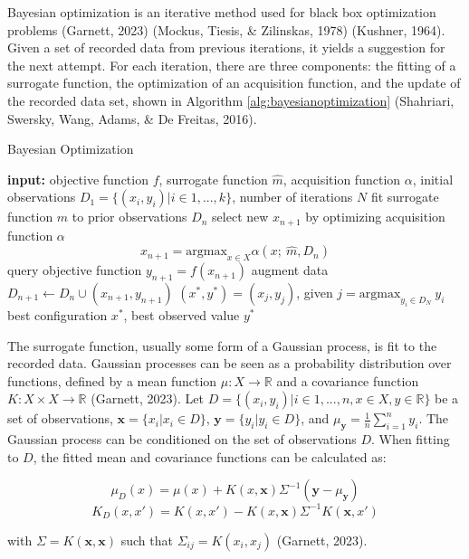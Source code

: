 \documentclass[12pt,twoside]{reedthesis}
\begin{document}
Bayesian optimization is an iterative method used for black box optimization problems (Garnett, 2023) (Mockus, Tiesis, \& Zilinskas, 1978) (Kushner, 1964). Given a set of recorded data from previous iterations, it yields a suggestion for the next attempt. For each iteration, there are three components: the fitting of a surrogate function, the optimization of an acquisition function, and the update of the recorded data set, shown in Algorithm \ref{alg:bayesianoptimization} (Shahriari, Swersky, Wang, Adams, \& De Freitas, 2016).
\begin{algorithm}[H]
    \caption{Bayesian Optimization}
    \label{alg:bayesianoptimization}
    \begin{algorithmic}
    \State \textbf{input:} objective function $f$, surrogate function $\hat{m}$, acquisition function $\alpha$, initial observations $D_1=\{(x_i,y_i)|i\in1,...,k\}$, number of iterations $N$
        \State fit surrogate function $\hat{m}$ to prior observations $D_n$
        \State select new $x_{n+1}$ by optimizing acquisition function $\alpha$\\
            $$x_{n+1}=\text{argmax}_{x\in X} \alpha(x;\ \hat{m}, D_n)$$
        \State query objective function $y_{n+1}=f(x_{n+1})$ 
        \State augment data $D_{n+1}\gets D_n\cup(x_{n+1},y_{n+1})$
    \EndFor
    \State $(x^*,y^*)=(x_j,y_j)$, given $j=\text{argmax}_{y_i\in D_N}\ y_i$
    \State \Return best configuration $x^*$, best observed value $y^*$
    \end{algorithmic}
\end{algorithm}
The surrogate function, usually some form of a Gaussian process, is fit to the recorded data. Gaussian processes can be seen as a probability distribution over functions, defined by a mean function \(\mu:X\to\mathbb{R}\) and a covariance function \(K:X\times X\to\mathbb{R}\) (Garnett, 2023). Let \(D=\{(x_i,y_i)|i\in1,...,n, x\in X,y\in\mathbb{R}\}\) be a set of observations, \(\textbf{x}=\{x_i|x_i\in D\}\), \(\textbf{y}=\{y_i|y_i\in D\}\), and \(\mu_{\textbf{y}}=\frac{1}{n}\sum_{i=1}^ny_i\). The Gaussian process can be conditioned on the set of observations \(D\). When fitting to \(D\), the fitted mean and covariance functions can be calculated as:

\[\mu_D(x)=\mu(x)+K(x,\textbf{x})\Sigma^{-1}(\textbf{y}-\mu_{\textbf{y}})\]
\[K_D(x,x')=K(x,x')-K(x,\textbf{x})\Sigma^{-1}K(\textbf{x},x')\]

with \(\Sigma=K(\textbf{x},\textbf{x})\) such that \(\Sigma_{ij}=K(x_i,x_j)\) (Garnett, 2023).
\end{document}
